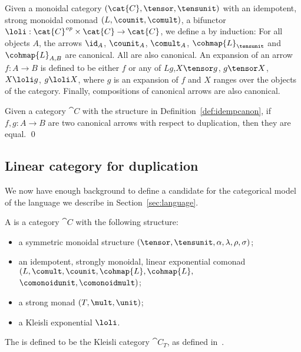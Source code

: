 \documentclass{llncs}
\begin{document}
\begin{definition}\label{def:idempcanon}\rm
  Given a monoidal category $(\cat{C},\tensor,\tensunit)$ with
   an idempotent, strong monoidal comonad $(L,\counit,\comult)$,
   a bifunctor
    $\loli:\cat{C}^{\it op}\times\cat{C}\to \cat{C}$,
  we define a  by induction:
  For all objects $A$, the arrows $\id_A$, $\counit_A$,
    $\comult_A$, $\cohmap{L}_{\tensunit}$ and $\cohmap{L}_{A,B}$
    are canonical.
  All  are also canonical. An expansion of an arrow
    $f:A\to B$ is defined to be either $f$ or any of
    $Lg$,$ X\tensor g$, $g\tensor X$, $X\loli g$, $g\loli X$,
    where $g$ is an expansion of $f$ and $X$ ranges over the objects
    of the category.
  Finally, compositions of canonical arrows are also canonical.
\end{definition}

\begin{theorem}\label{the:ciposet}
  Given a category $\cat{C}$ with the structure in
  Definition~\ref{def:idempcanon}, if $f,g:A\to B$ are two canonical
  arrows with respect to duplication, then they are equal. \qed
\end{theorem}


\subsection{Linear category for duplication}

We now have enough background to define a candidate for the
categorical model of the language we describe in
Section~\ref{sec:language}.


\begin{definition}\rm
  A  is a
  category $\cat{C}$ with the following structure:
  \begin{itemize}
  \item a symmetric monoidal structure
  $(\tensor,\tensunit,\alpha,\lambda,\rho,\sigma)$;
  \item an idempotent, strongly monoidal, linear exponential comonad
  $(L,\comult,\counit,\cohmap{L},\cohmap{L},$ 
    $\comonoidunit,\comonoidmult)$;
  \item a strong monad $(T,\mult,\unit)$;
  \item a Kleisli exponential $\loli$.
  \end{itemize}
  The  is defined to be
  the Kleisli category $\cat{C}_T$, as defined in~\cite{moggi91notions}.
\end{definition}
\end{document}
